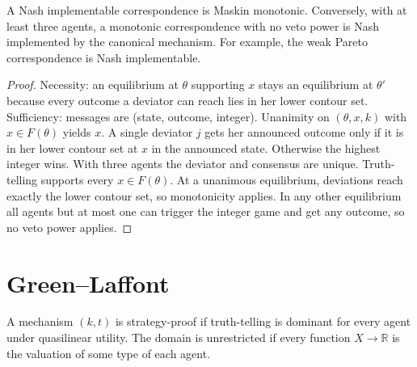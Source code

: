\begin{theorem}
\label{thm:maskin}
\leanok
{}
A Nash implementable correspondence is Maskin monotonic. Conversely, with at least three agents, a monotonic
correspondence with no veto power is Nash implemented by the canonical mechanism. For example, the weak Pareto
correspondence is Nash implementable.
\end{theorem}
\begin{proof}
\leanok
Necessity: an equilibrium at $\theta$ supporting $x$ stays an equilibrium at $\theta'$ because every outcome a
deviator can reach lies in her lower contour set. Sufficiency: messages are (state, outcome, integer). Unanimity
on $(\theta, x, k)$ with $x \in F(\theta)$ yields $x$. A single deviator $j$ gets her announced outcome only if it
is in her lower contour set at $x$ in the announced state. Otherwise the highest integer wins. With three agents
the deviator and consensus are unique. Truth-telling supports every $x \in F(\theta)$. At a unanimous equilibrium,
deviations reach exactly the lower contour set, so monotonicity applies. In any other equilibrium all agents but
at most one can trigger the integer game and get any outcome, so no veto power applies.
\end{proof}

\section{Green--Laffont}

\begin{definition}
\label{def:sp-unrestricted}
\leanok
{}
A mechanism $(k, t)$ is strategy-proof if truth-telling is dominant for every agent under quasilinear utility. The
domain is unrestricted if every function $X \to \mathbb R$ is the valuation of some type of each agent.
\end{definition}


